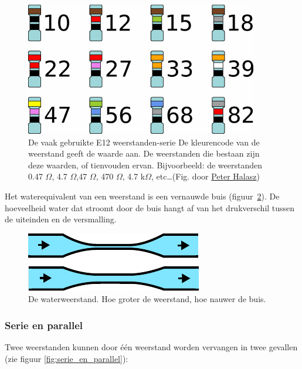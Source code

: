 \documentclass{article}
\begin{document}
			\begin{figure}[htbp]
				\centering
				\includegraphics{e12}
				\caption{
				De vaak gebruikte E12 weerstanden-serie
				De kleurencode van de weerstand geeft de waarde aan. De weerstanden die bestaan zijn deze waarden, of tienvouden ervan. Bijvoorbeeld: de weerstanden 0.47 $\Omega$,  4.7 $\Omega$,47 $\Omega$, 470 $\Omega$, 4.7 k$\Omega$, etc\ldots (Fig. door \href{https://en.wikipedia.org/wiki/User:Pengo}{Peter Halasz})
				} 
				\label{fig:e12}
			\end{figure}

			Het waterequivalent van een weerstand is een vernauwde buis (figuur~\ref{fig:waterweerstand}). De hoeveelheid water dat stroomt door de buis hangt af van het drukverschil tussen de uiteinden en de versmalling.

			\begin{figure}[htbp]
				\centering
				\includegraphics{waterweerstand}
				\caption{De waterweerstand. Hoe groter de weerstand, hoe nauwer de buis.}
				\label{fig:waterweerstand}
			\end{figure}

		\subsubsection{Serie en parallel}
			\label{sssec:serie_en_parallel}
			Twee weerstanden kunnen door \'e\'en  weerstand worden vervangen in twee gevallen (zie figuur \ref{fig:serie_en_parallel}):
\end{document}

